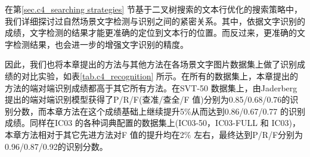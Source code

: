 

        在第\ref{sec.c4_searching strategies} 节基于二叉树搜索的文本行优化的搜索策略中，我们详细探讨过自然场景文字检测与识别之间的紧密关系。其中，依据文字识别的成绩，文字检测的结果才能更准确的定位到文本行的位置。而反过来，更准确的文字检测结果，也会进一步的增强文字识别的精度。

        因此，我们也将本章提出的方法与其他方法在各场景文字图片数据集上做了识别成绩的对比实验，如表\ref{tab.c4_recognition} 所示。在所有的数据集上，本章提出的方法的端对端识别成绩都高于其它所有方法。在SVT-50 数据集上，由Jaderberg\cite{Jaderberg2016Reading} 提出的端对端识别模型获得了P/R/F(查准/查全/F 值)分别为0.85/0.68/0.76的识别分数，而本章方法在这个成绩基础上继续提升5\%从而达到0.86/0.67/0.77 的识别成绩。同样在IC03 的各种词典配置的数据集上(IC03-50，IC03-FULL 和 IC03)，本章方法相对于其它先进方法对F 值的提升均在2\% 左右，最终达到P/R/F分别为0.96/0.87/0.92的识别分数。

